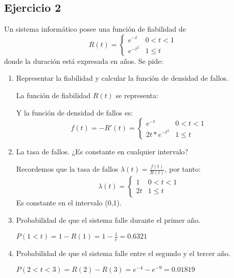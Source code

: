 \subsection{Ejercicio 2}
Un sistema informático posee una función de fiabilidad de
\[ R(t)=\begin{cases} 
      e^{-t} & 0<t<1 \\
      e^{-t^2} & 1\leq t 
   \end{cases}
\]
donde la duración está expresada en años. Se pide:
\begin{enumerate}
    \item Representar la fiabilidad y calcular la función de densidad de fallos.
    \begin{tcolorbox}[colback=white,colframe=cyan!50!black,fonttitle=\bfseries]
    La función de fiabilidad $R(t)$ se representa:
    \begin{center}
    \end{center}
    Y la función de densidad de fallos es:
    \[ f(t)=-R'(t)=\begin{cases} 
      e^{-t} & 0<t<1 \\
      2t*e^{-t^2} & 1\leq t 
    \end{cases}
    \]
    \end{tcolorbox}
    \item La tasa de fallos. ¿Es constante en cualquier intervalo?
    \begin{tcolorbox}[colback=white,colframe=cyan!50!black,fonttitle=\bfseries]
    Recordemos que la tasa de fallos $\lambda(t) = \frac{f(t)}{R(t)}$, por tanto:
    \[ \lambda(t)=\begin{cases} 
      1 & 0<t<1 \\
      2t & 1\leq t 
    \end{cases}
    \]
    Es constante en el intervalo (0,1).
    \end{tcolorbox}
    \item Probabilidad de que el sistema falle durante el primer año.
    \begin{tcolorbox}[colback=white,colframe=cyan!50!black,fonttitle=\bfseries]
    $P(1<t)=1-R(1)=1-\frac{1}{e}= 0.6321$
    \end{tcolorbox}
    \item Probabilidad de que el sistema falle entre el segundo y el tercer año.
    \begin{tcolorbox}[colback=white,colframe=cyan!50!black,fonttitle=\bfseries]
    $P(2<t<3)=R(2)-R(3)=e^{-4}-e^{-9}= 0.01819$
    \end{tcolorbox}
\end{enumerate}

